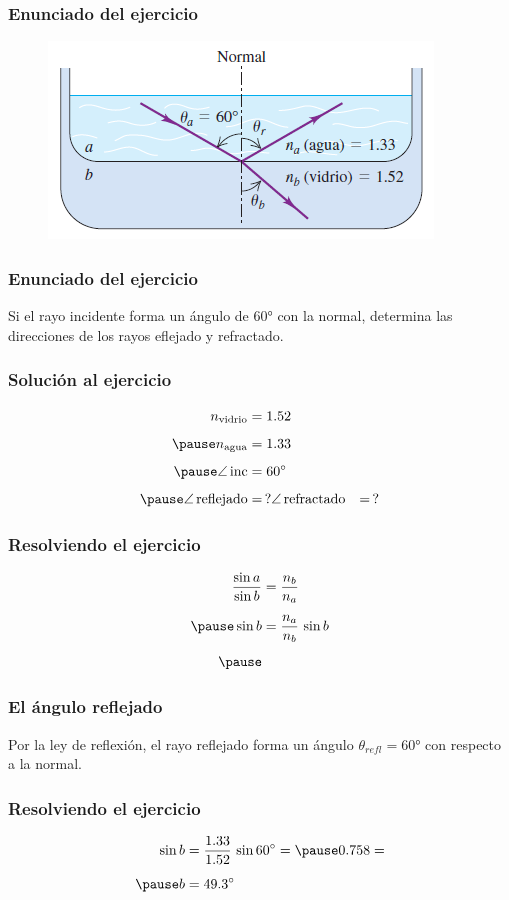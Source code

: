 \documentclass[14pt]{beamer}
\begin{document}
\begin{frame}
\frametitle{Enunciado del ejercicio}
\begin{figure}
    \centering
    \includegraphics[scale=1]{Imagenes/Refraccion_Ondas_04.png}
\end{figure}
\end{frame}
\begin{frame}
\frametitle{Enunciado del ejercicio}
Si el rayo incidente forma un ángulo de \ang{60} con la normal, determina las direcciones de los rayos eflejado y refractado.
\end{frame}
\begin{frame}
\frametitle{Solución al ejercicio}
\pause
\begin{eqnarray*}
\begin{aligned}
n_{\text{vidrio}} &= 1.52 \\[0.5em] \pause
n_{\text{agua}} &= 1.33 \\[0.5em] \pause
\angle \, \text{inc} &= \ang{60} \\[0.5em] \pause
\angle \, \text{reflejado} &= \, ?
\angle \, \text{refractado} &= \, ?
\end{aligned}
\end{eqnarray*}
\end{frame}
\begin{frame}
\frametitle{Resolviendo el ejercicio}
\pause
\begin{eqnarray*}
\begin{aligned}
\dfrac{\sin a}{\sin b} &= \dfrac{n_{b}}{n_{a}}  \\[0.5em] \pause
\sin b &= \dfrac{n_{a}}{n_{b}} \, \sin b \\[0.5em] \pause
\end{aligned}
\end{eqnarray*}
\end{frame}
\begin{frame}
\frametitle{El ángulo reflejado}
Por la ley de reflexión, el rayo reflejado forma un ángulo $\theta_{refl} = \ang{60}$ con respecto a la normal.
\end{frame}
\begin{frame}
\frametitle{Resolviendo el ejercicio}
\pause
\begin{eqnarray*}
\begin{aligned}
\sin b &= \dfrac{1.33}{1.52} \, \sin \ang{60}  = \pause 0.758 = \\[0.5em] \pause
b &= \ang{49.3}
\end{aligned}
\end{eqnarray*}
\end{frame}
    
\end{document}
